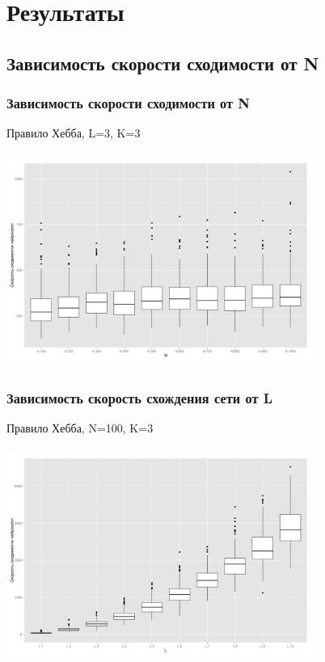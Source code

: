 \documentclass{beamer}
\begin{document}
\section{Результаты}

\subsection{Зависимость скорости сходимости от N}
\begin{frame}
\frametitle{Зависимость скорости сходимости от N}
Правило Хебба, L=3, K=3
\begin{center}
\includegraphics[width=10cm, height=7cm]{../../plots/l3pn3N_vs_tsync_100.png}

\end{center}
\end{frame}

\begin{frame}
\frametitle{Зависимость скорость схождения сети от L}
Правило Хебба, N=100, K=3
\begin{center}
\includegraphics[width=10cm, height=7cm]{../../plots/n100pn3LvsTsync.png}

\end{center}
\end{frame}
\end{document}
